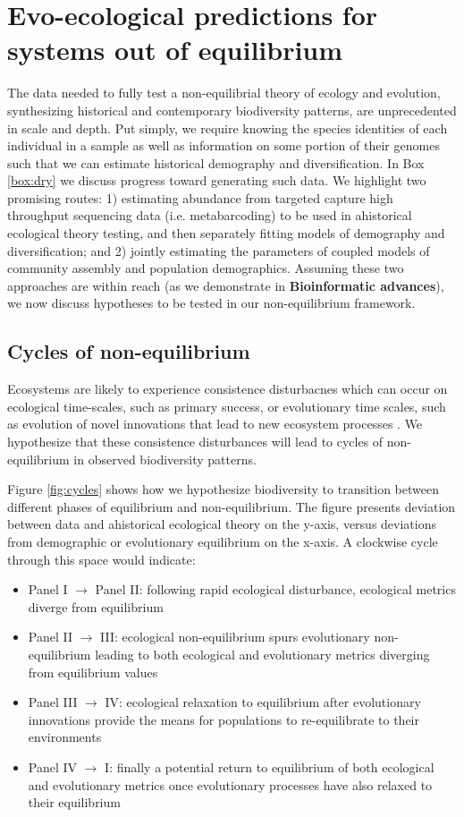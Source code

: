 \documentclass[12pt]{article}
\newcounter{Box}
\begin{document}
\section{Evo-ecological predictions for systems out of equilibrium} \label{sec:pred}

The data needed to fully test a non-equilibrial theory of ecology and
evolution, synthesizing historical and contemporary biodiversity
patterns, are unprecedented in scale and depth. Put simply, we require
knowing the species identities of each individual in a sample as well
as information on some portion of their genomes such that we can
estimate historical demography and diversification. In Box
\ref{box:dry} we discuss progress toward generating such data. We
highlight two promising routes: 1) estimating abundance from targeted
capture high throughput sequencing data (i.e.  metabarcoding) to be
used in ahistorical ecological theory testing, and then separately
fitting models of demography and diversification; and 2) jointly
estimating the parameters of coupled models of community assembly and
population demographics. Assuming these two approaches are within
reach (as we demonstrate in \textbf{Bioinformatic advances}), we now
discuss hypotheses to be tested in our non-equilibrium framework.

\subsection{Cycles of non-equilibrium}

Ecosystems are likely to experience consistence disturbacnes which can
occur on ecological time-scales, such as primary success, or
evolutionary time scales, such as evolution of novel innovations that
lead to new ecosystem processes \citep{redQueen, benton2009}. We
hypothesize that these consistence disturbances will lead to cycles of
non-equilibrium in observed biodiversity patterns.

Figure \ref{fig:cycles} shows how we hypothesize biodiversity to
transition between different phases of equilibrium and
non-equilibrium. The figure presents deviation between data and
ahistorical ecological theory on the y-axis, versus deviations from
demographic or evolutionary equilibrium on the x-axis. A clockwise
cycle through this space would indicate:

\begin{itemize}
\item Panel I $\rightarrow$ Panel II: following rapid ecological
  disturbance, ecological metrics diverge from equilibrium
\item Panel II $\rightarrow$ III: ecological non-equilibrium spurs
  evolutionary non-equilibrium leading to both ecological and
  evolutionary metrics diverging from equilibrium values
\item Panel III $\rightarrow$ IV: ecological relaxation to equilibrium
  after evolutionary innovations provide the means for populations to
  re-equilibrate to their environments
\item Panel IV $\rightarrow$ I: finally a potential return to
  equilibrium of both ecological and evolutionary metrics once
  evolutionary processes have also relaxed to their equilibrium
\end{itemize}
\end{document}

